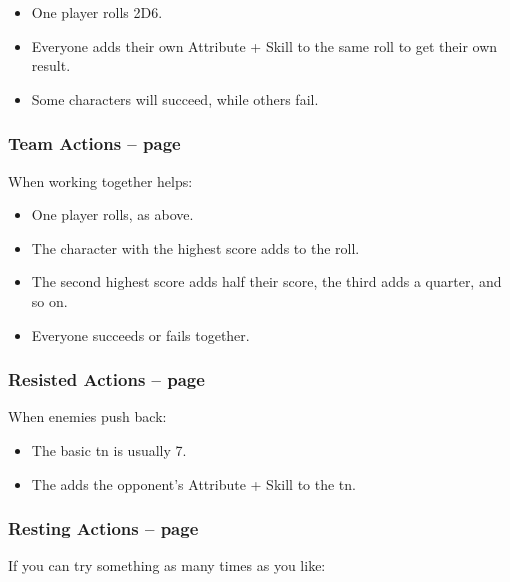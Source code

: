 \begin{multicols}{2}
\begin{itemize}
  \item
  One player rolls 2D6.
  \item
  Everyone adds their own Attribute + Skill to the same roll to get their own result.
  \item
  Some characters will succeed, while others fail.

\end{itemize}

\subsubsection{Team Actions -- page \pageref{teamwork}}

When working together helps:

\begin{itemize}

  \item
  One player rolls, as above.
  \item
  The character with the highest score adds to the roll.
  \item
  The second highest score adds half their score, the third adds a quarter, and so on.
  \item
  Everyone succeeds or fails together.

\end{itemize}

\subsubsection{Resisted Actions -- page \pageref{resistedactions}}

When enemies push back:

\begin{itemize}

  \item{The basic \gls{tn} is usually 7.}
  \item{The  adds the opponent's Attribute + Skill to the \gls{tn}.}

\end{itemize}

\subsubsection{Resting Actions -- page \pageref{restingactions}}

If you can try something as many times as you like:

\begin{itemize}


\end{itemize}
\end{multicols}
